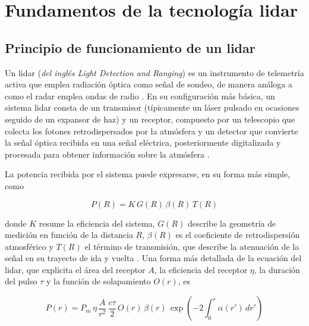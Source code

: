 \chapter{Fundamentos de la tecnología lidar}
\label{cap:lidar_hsrl}

\section{Principio de funcionamiento de un lidar}
\label{sec:principio_lidar}

Un lidar (\emph{del inglés Light Detection and Ranging}) es un instrumento de telemetría activa que emplea radiación óptica como señal de sondeo, de manera análoga a como el radar emplea ondas de radio \cite{weitkamp2005}. En su configuración más básica, un sistema lidar consta de un transmisor (típicamente un láser pulsado en ocasiones seguido de un expansor de haz) y un receptor, compuesto por un telescopio que colecta los fotones retrodispersados por la atmósfera y un detector que convierte la señal óptica recibida en una señal eléctrica, posteriormente digitalizada y procesada para obtener información sobre la atmósfera \cite{kovalev2015,weitkamp2005}.

La potencia recibida por el sistema puede expresarse, en su forma más simple, como \cite{weitkamp2005}

\begin{equation}
  P(R) = K \, G(R) \, \beta(R) \, T(R)
  \label{eq:lidar_simple}
\end{equation}

\noindent donde $K$ resume la eficiencia del sistema, $G(R)$ describe la geometría de medición en función de la distancia $R$, $\beta(R)$ es el coeficiente de retrodispersión atmosférico y $T(R)$ el
término de transmisión, que describe la atenuación de la señal en su trayecto de ida y vuelta \cite{weitkamp2005}. Una forma más detallada de la ecuación del lidar, que explicita el área del
receptor $A$, la eficiencia del receptor $\eta$, la duración del pulso $\tau$ y la función de solapamiento $O(r)$, es

\begin{equation}
  P(r) = P_m \, \eta \, \frac{A}{r^2} \, \frac{c \tau}{2} \, O(r) \,
  \beta(r) \, \exp\left(-2\int_0^{r}\alpha(r')\,dr'\right)
  \label{eq:lidar_equation}
\end{equation}

